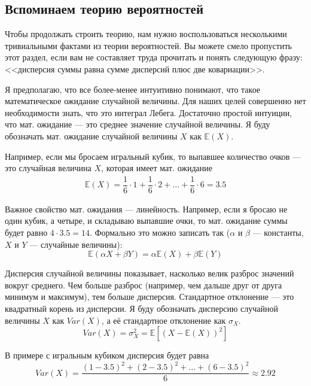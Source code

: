 \subsection{Вспоминаем теорию вероятностей}

Чтобы продолжать строить теорию, нам нужно воспользоваться не\-сколь\-ки\-ми 
тривиальными фактами из теории вероятностей. Вы можете смело пропустить этот 
раздел, если вам не составляет труда прочитать и понять следующую фразу: 
<<дисперсия суммы равна сумме дисперсий плюс две ковариации>>.

Я предполагаю, что все более-менее интуитивно понимают, что такое 
математическое ожидание случайной величины. Для наших целей совершенно нет 
необходимости знать, что это интеграл Лебега. Достаточно простой интуиции, что 
мат. ожидание --- это среднее значение случайной величины. Я буду обозначать 
мат. ожидание случайной величины $X$ как $\mathbb{E}(X)$.

Например, если мы бросаем игральный кубик, то выпавшее количество очков --- это 
случайная величина $X$, которая имеет мат. ожидание
\begin{align*}
\mathbb{E}(X) = \dfrac{1}{6}\cdot 1 + \dfrac{1}{6}\cdot 2
+ ... + \dfrac{1}{6}\cdot 6 = 3.5
\end{align*}

Важное свойство мат. ожидания --- линейность. Например, если я бросаю не один 
кубик, а четыре, и складываю выпавшие очки, то мат. ожидание суммы будет равно 
$4 \cdot 3.5 =  14$. Формально это можно записать так ($\alpha$ и $\beta$ --- 
константы, $X$ и $Y$ --- случайные величины):
\begin{equation*}
\mathbb{E}(\alpha X + \beta Y) = \alpha\mathbb{E}(X) + \beta\mathbb{E}(Y)
\end{equation*}

Дисперсия случайной величины показывает, насколько велик разброс значений вокруг 
среднего. Чем больше разброс (например, чем дальше друг от друга минимум и 
максимум), тем больше дисперсия. Стандартное отклонение --- это квадратный 
корень из дисперсии. Я буду обозначать дисперсию случайной величины $X$ как  
$Var(X)$, а её стандартное отклонение как $\sigma_X$.
\begin{equation*}
Var(X) = \sigma_X^2 = \mathbb{E}\left[(X - \mathbb{E}(X))^2 \right]
\end{equation*}

В примере с игральным кубиком дисперсия будет равна
\begin{equation*}
Var(X) = \dfrac{(1 - 3.5)^2 + (2 - 3.5)^2 + ... + (6 - 3.5)^2}{6} \approx 2.92
\end{equation*}

